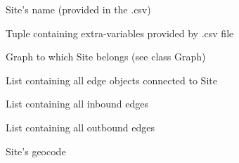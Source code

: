 \documentclass[a4paper,10pt,english]{sphinxmanual}
\begin{document}
\begin{fulllineitems}

\begin{fulllineitems}
\label{scripting:Site.sitename}
Site's name (provided in the .csv)

\end{fulllineitems}


\begin{fulllineitems}
\label{scripting:Site.values}
Tuple containing extra-variables provided by .csv file

\end{fulllineitems}


\begin{fulllineitems}
\label{scripting:Site.parentGraph}
Graph to which Site belongs (see class Graph)

\end{fulllineitems}


\begin{fulllineitems}
\label{scripting:Site.edges}
List containing all edge objects connected to Site

\end{fulllineitems}


\begin{fulllineitems}
\label{scripting:Site.inedges}
List containing all inbound edges

\end{fulllineitems}


\begin{fulllineitems}
\label{scripting:Site.outedges}
List containing all outbound edges

\end{fulllineitems}


\begin{fulllineitems}
\label{scripting:Site.geocode}
Site's geocode


\end{fulllineitems}
\end{fulllineitems}
\end{document}
